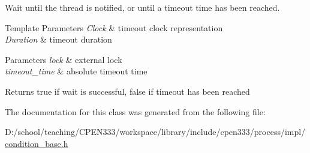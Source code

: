 Wait until the thread is notified, or until a timeout time has been reached. 


\begin{DoxyTemplParams}{Template Parameters}
{\em Clock} & timeout clock representation \\
\hline
{\em Duration} & timeout duration \\
\hline
\end{DoxyTemplParams}

\begin{DoxyParams}{Parameters}
{\em lock} & external lock \\
\hline
{\em timeout\+\_\+time} & absolute timeout time \\
\hline
\end{DoxyParams}
\begin{DoxyReturn}{Returns}
true if wait is successful, false if timeout has been reached 
\end{DoxyReturn}


The documentation for this class was generated from the following file\+:\begin{DoxyCompactItemize}
\item 
D\+:/school/teaching/\+C\+P\+E\+N333/workspace/library/include/cpen333/process/impl/\hyperlink{condition__base_8h}{condition\+\_\+base.\+h}\end{DoxyCompactItemize}
